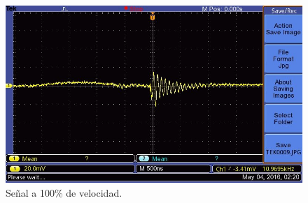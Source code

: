   \begin{figure}[!htbp]
 \centering
 \includegraphics [scale=0.25]
 {./img/tek0009.jpg}
  \caption{Se\~nal a 100\% de velocidad.}
 \end{figure}

\pagebreak